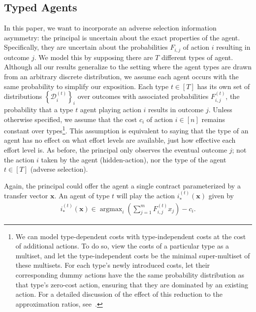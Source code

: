 \documentclass{article}
\DeclareMathOperator*{\argmax}{argmax}
\newcommand{\D}{\mathcal{D}}
\newcommand{\Cost}[1]{c_{#1}}
\newcommand{\Forecast}[2]{F_{#1, #2}}
\newcommand{\TypedForecast}[3]{F^{(#1)}_{#2, #3}}
\newcommand{\Contract}[1]{x_{#1}}
\newcommand{\ContractVector}{\bm{x}}
\newcommand{\OptimalAction}{i_*}
\newcommand{\TypedOptimalAction}[1]{\OptimalAction^{(#1)}}
\begin{document}
\subsection{Typed Agents}

In this paper, we want to incorporate an adverse selection information asymmetry: the principal is uncertain about the exact properties of the agent. Specifically, they are uncertain about the probabilities $\Forecast{i}{j}$ of action $i$ resulting in outcome $j$. We model this by supposing there are $T$ different types of agent.  Although all our results generalize to the setting where the agent types are drawn from an arbitrary discrete distribution, we assume each agent occurs with the same probability to simplify our exposition. Each type $t \in [T]$ has its own set of distributions $\left\{\D_i^{(t)}\right\}_i$ over outcomes with associated probabilities $\TypedForecast{t}{i}{j}$, the probability that a type $t$ agent playing action $i$ results in outcome $j$. Unless otherwise specified, we assume that the cost $\Cost{i}$ of action $i \in [n]$ remains constant over types\footnote{We can model type-dependent costs with type-independent costs at the cost of additional actions. To do so, view the costs of a particular type as a multiset, and let the type-independent costs be the minimal super-multiset of these multisets. For each type's newly introduced costs, let their corresponding dummy actions have the the same probability distribution as that type's zero-cost action, ensuring that they are dominated by an existing action. For a detailed discussion of the effect of this reduction to the approximation ratios, see~.}. This assumption is equivalent to saying that the type of an agent has no effect on what effort levels are available, just how effective each effort level is. As before, the principal only observes the eventual outcome $j$; not the action $i$ taken by the agent (hidden-action), nor the type of the agent $t \in [T]$ (adverse selection).

Again, the principal could offer the agent a single contract parameterized by a transfer vector $\ContractVector$. An agent of type $t$ will play the action $\TypedOptimalAction{t}(\ContractVector)$ given by
\begin{align*}
  \TypedOptimalAction{t}(\ContractVector) \in \argmax_i \left( \sum_{j=1}^m \TypedForecast{t}{i}{j} \Contract{j} \right) - \Cost{i} \text{.}
\end{align*}
\end{document}
